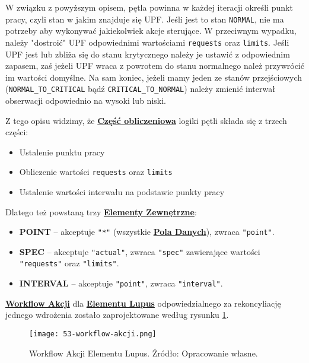 W związku z powyższym opisem, pętla powinna w każdej iteracji określi punkt pracy, czyli stan w jakim znajduje się UPF. Jeśli jest to stan \texttt{NORMAL}, nie ma potrzeby aby wykonywać jakiekolwiek akcje sterujące. W przeciwnym wypadku, należy "dostroić" UPF odpowiednimi wartościami \texttt{requests} oraz \texttt{limits}. Jeśli UPF jest lub zbliża się do stanu krytycznego należy je ustawić z odpowiednim zapasem, zaś jeżeli UPF wraca z powrotem do stanu normalnego należ przywrócić im wartości domyślne. Na sam koniec, jeżeli mamy jeden ze stanów przejściowych (\texttt{NORMAL\_TO\_CRITICAL} bądź \texttt{CRITICAL\_TO\_NORMAL}) należy zmienić interwał obserwacji odpowiednio na wysoki lub niski.

Z tego opisu widzimy, że \hyperlink{def:czesc-obliczeniowa}{\textbf{Część obliczeniowa}} logiki pętli składa się z trzech części:
\begin{itemize}
    \item Ustalenie punktu pracy 
    \item Obliczenie wartości \texttt{requests} oraz \texttt{limits}
    \item Ustalenie wartości interwału na podstawie punkty pracy
\end{itemize}

Dlatego też powstaną trzy \hyperlink{def:element-zewnetrzny}{\textbf{Elementy Zewnętrzne}}:
\begin{itemize}
    \item \textbf{POINT} – akceptuje \texttt{"*"} (wszystkie \hyperlink{def:pole-danych}{\textbf{Pola Danych}}), zwraca \texttt{"point"}.
    \item \textbf{SPEC} – akceptuje \texttt{"actual"}, zwraca \texttt{"spec"} zawierające wartości \texttt{"requests"} oraz \texttt{"limits"}.
    \item \textbf{INTERVAL} – akceptuje \texttt{"point"}, zwraca \texttt{"interval"}.
\end{itemize}

\hyperlink{def:workflow-akcji}{\textbf{Workflow Akcji}} dla \hyperlink{def:element-lupus}{\textbf{Elementu Lupus}} odpowiedzialnego za rekoncyliację jednego wdrożenia zostało zaprojektowane według rysunku \ref{fig:53-workflow-akcji}.

\begin{figure}[!h]
    \centering \texttt{[image: 53-workflow-akcji.png]}
    \caption{Workflow Akcji Elementu Lupus. Źródło: Opracowanie własne.}\label{fig:53-workflow-akcji}
\end{figure}

